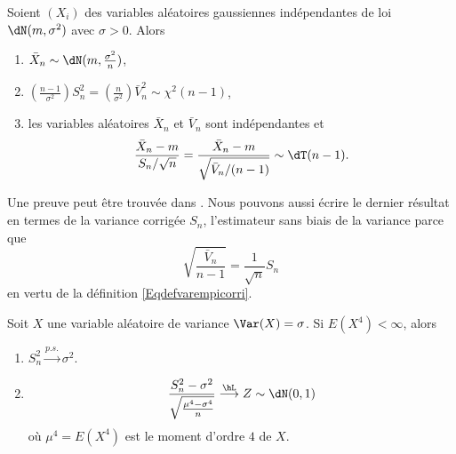 \begin{theorem}     \label{ThoCochraneChiStudent}  
    Soient \( (X_i)\) des variables aléatoires gaussiennes indépendantes de loi \( \dN(m,\sigma^2)\) avec \( \sigma>0\). Alors
    \begin{enumerate}
        \item
            \( \bar X_n\sim\dN(m,\frac{ \sigma^2 }{ n })\),
        \item       \label{ItemThoCochraneChiStudentii}
            \( \left( \frac{ n-1 }{ \sigma^2 } \right)S_n^2=\left( \frac{ n }{ \sigma^2 } \right)\bar V_n^2\sim\chi^2(n-1)\),
        \item
            les variables aléatoires \( \bar X_n\) et \( \bar V_n\) sont indépendantes et
            \begin{equation}
                \frac{ \bar X_n-m }{ S_n/\sqrt{n} }=\frac{ \bar X_n-m }{ \sqrt{\bar V_n/(n-1)} }\sim\dT(n-1).
            \end{equation}
    \end{enumerate}
\end{theorem}
Une preuve peut être trouvée dans \cite{ProbaDanielLi}. Nous pouvons aussi écrire le dernier résultat en termes de la variance corrigée \( S_n\), l'estimateur sans biais de la variance parce que
\begin{equation}
    \sqrt{\frac{ \bar V_n }{ n-1 }}=\frac{1}{ \sqrt{n} }S_n
\end{equation}
en vertu de la définition \eqref{Eqdefvarempicorri}.


\begin{proposition}
    Soit \( X\) une variable aléatoire de variance \( \Var(X)=\sigma\). Si \( E(X^4)<\infty\), alors
    \begin{enumerate}
        \item
            \( S_n^2\stackrel{p.s.}{\longrightarrow}\sigma^2\).
        \item
            \begin{equation}
                \frac{ S_n^2-\sigma^2 }{ \sqrt{\frac{ \mu^4-\sigma^4 }{ n }} }\stackrel{\hL}{\longrightarrow}Z\sim\dN(0,1)
            \end{equation}
            où \( \mu^4=E(X^4)\) est le moment d'ordre \( 4\) de \( X\).
    \end{enumerate}
\end{proposition}

